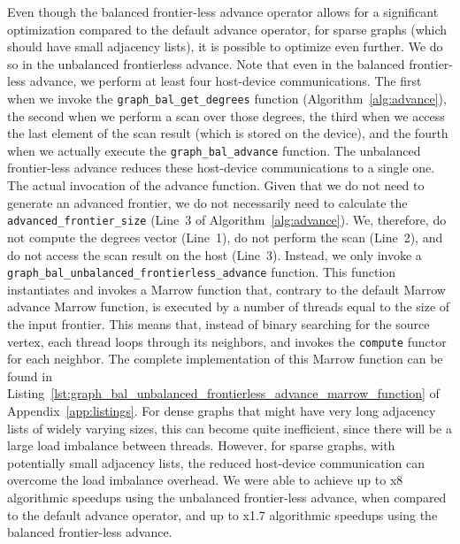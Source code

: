 Even though the balanced frontier-less advance operator allows for a significant optimization compared to the default advance operator, for sparse graphs (which should have small adjacency lists), it is possible to optimize even further. We do so in the unbalanced frontierless advance. Note that even in the balanced frontier-less advance, we perform at least four host-device communications. The first when we invoke the \texttt{graph\_bal\_get\_degrees} function (Algorithm~\ref{alg:advance}), the second when we perform a scan over those degrees, the third when we access the last element of the scan result (which is stored on the device), and the fourth when we actually execute the \texttt{graph\_bal\_advance} function. The unbalanced frontier-less advance reduces these host-device communications to a single one. The actual invocation of the advance function. Given that we do not need to generate an advanced frontier, we do not necessarily need to calculate the \texttt{advanced\_frontier\_size} (Line~3 of Algorithm~\ref{alg:advance}). We, therefore, do not compute the degrees vector (Line~1), do not perform the scan (Line~2), and do not access the scan result on the host (Line~3). Instead, we only invoke a \texttt{graph\_bal\_unbalanced\_frontierless\_advance} function. This function instantiates and invokes a Marrow function that, contrary to the default Marrow advance Marrow function, is executed by a number of threads equal to the size of the input frontier. This means that, instead of binary searching for the source vertex, each thread loops through its neighbors, and invokes the \texttt{compute} functor for each neighbor. The complete implementation of this Marrow function can be found in Listing~\ref{lst:graph_bal_unbalanced_frontierless_advance_marrow_function} of Appendix~\ref{app:listings}. 
For dense graphs that might have very long adjacency lists of widely varying sizes, this can become quite inefficient, since there will be a large load imbalance between threads. However, for sparse graphs, with potentially small adjacency lists, the reduced host-device communication can overcome the load imbalance overhead. We were able to achieve up to x8 algorithmic speedups using the unbalanced frontier-less advance, when compared to the default advance operator, and up to x1.7 algorithmic speedups using the balanced frontier-less advance.




% 

